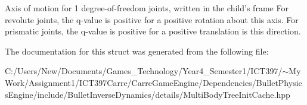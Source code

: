 Axis of motion for 1 degree-of-freedom joints, written in the child's frame For revolute joints, the q-value is positive for a positive rotation about this axis. For prismatic joints, the q-value is positive for a positive translation is this direction. 

The documentation for this struct was generated from the following file:\begin{CompactItemize}
\item 
C:/Users/New/Documents/Games\_\-Technology/Year4\_\-Semester1/ICT397/$\sim$My Work/Assignment1/ICT397Carre/CarreGameEngine/Dependencies/BulletPhysicsEngine/include/BulletInverseDynamics/details/MultiBodyTreeInitCache.hpp\end{CompactItemize}
